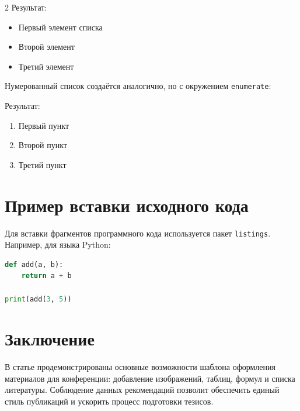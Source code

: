 \documentclass[a4paper,10pt,twoside]{article}
\begin{document}
\begin{multicols}{2}
Результат:
\begin{itemize}
  \item Первый элемент списка
  \item Второй элемент
  \item Третий элемент
\end{itemize}

Нумерованный список создаётся аналогично, но с окружением \verb|enumerate|:

Результат:
\begin{enumerate}
  \item Первый пункт
  \item Второй пункт
  \item Третий пункт
\end{enumerate}

\section{Пример вставки исходного кода}
Для вставки фрагментов программного кода используется пакет \texttt{listings}.  
Например, для языка Python:

\begin{lstlisting}[language=Python, caption={Пример Python-кода}]
def add(a, b):
    return a + b

print(add(3, 5))
\end{lstlisting}

% 
\section{Заключение}
В статье продемонстрированы основные возможности шаблона оформления материалов для конференции: добавление изображений, таблиц, формул и списка литературы. Соблюдение данных рекомендаций позволит обеспечить единый стиль публикаций и ускорить процесс подготовки тезисов.

% 


\end{multicols}
\end{document}
